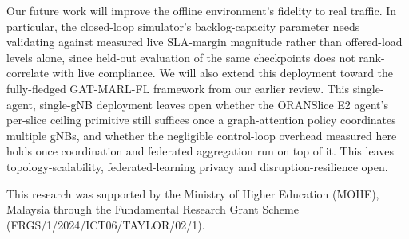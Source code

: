 \documentclass[10pt]{article}
\begin{document}
Our future work will improve the offline environment's fidelity to
real traffic. In particular, the closed-loop simulator's
backlog-capacity parameter needs validating against measured live
SLA-margin magnitude rather than offered-load levels alone, since
held-out evaluation of the same checkpoints does not rank-correlate
with live compliance. We will also extend this deployment toward the
fully-fledged GAT-MARL-FL framework from our earlier review. This
single-agent, single-gNB deployment leaves open whether the ORANSlice
E2 agent's per-slice ceiling primitive still suffices once a
graph-attention policy coordinates multiple gNBs, and whether the
negligible control-loop overhead measured here holds once
coordination and federated aggregation run on top of it. This leaves
topology-scalability, federated-learning privacy and
disruption-resilience open.

This research was supported by the Ministry of Higher Education
(MOHE), Malaysia through the Fundamental Research Grant Scheme
(FRGS/1/2024/ICT06/TAYLOR/02/1).

\enlargethispage{4\baselineskip}


\end{document}
